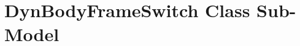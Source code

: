 %

\renewcommand\modelpartname{DynBodyFrameSwitch Class Sub-Model}
\renewcommand\modelpartid{DynBodyFrameSwitch}
\part{\modelpartname}\label{part:\modelpartid}





